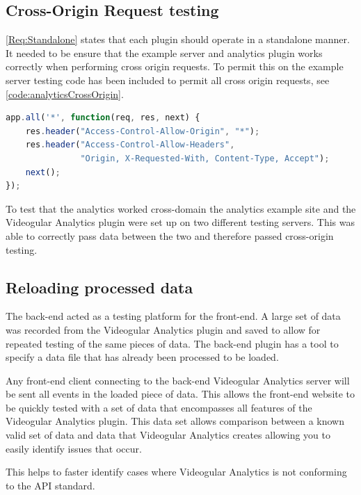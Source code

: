 \subsection{Cross-Origin Request testing}

\cref{Req:Standalone} states that each plugin should operate in a standalone manner. It needed to be ensure that the example server and analytics plugin works correctly when performing cross origin requests. To permit this on the example server testing code has been included to permit all cross origin requests, see \autoref{code:analyticsCrossOrigin}.

\begin{lstlisting}[language=javascript,caption={Code showing appending Cross-Origin headers to all responses}, label={code:analyticsCrossOrigin}]
app.all('*', function(req, res, next) {
	res.header("Access-Control-Allow-Origin", "*");
	res.header("Access-Control-Allow-Headers",
	           "Origin, X-Requested-With, Content-Type, Accept");
	next();
});
\end{lstlisting}

To test that the analytics worked cross-domain the analytics example site and the Videogular Analytics plugin were set up on two different testing servers. This was able to correctly pass data between the two and therefore passed cross-origin testing.

\subsection{Reloading processed data}
\label{Section:reloading processed data}

The back-end acted as a testing platform for the front-end. A large set of data was recorded from the Videogular Analytics plugin and saved to allow for repeated testing of the same pieces of data. The back-end plugin has a tool to specify a data file that has already been processed to be loaded.

Any front-end client connecting to the back-end \gls{Videogular} Analytics server will be sent all events in the loaded piece of data. This allows the front-end website to be quickly tested with a set of data that encompasses all features of the \gls{Videogular} Analytics plugin. This data set allows comparison between a known valid set of data and data that \gls{Videogular} Analytics creates allowing you to easily identify issues that occur.

This helps to faster identify cases where \gls{Videogular} Analytics is not conforming to the \gls{API} standard.

